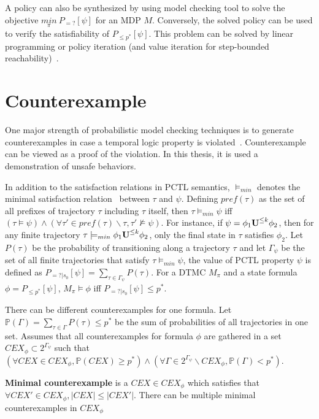 A policy can also be synthesized by using model checking tool to solve the objective $\underset{\pi}{min}\ P_{=?}[\psi]$ for an MDP $M$. Conversely, the solved policy can be used to verify the satisfiability of $P_{\leq p^*}[\psi]$. 
This problem can be solved by linear programming or policy iteration (and value iteration for step-bounded reachability)~\cite{Kwiatkowska2013}.

\section{Counterexample}
One major strength of probabilistic model checking techniques is to generate counterexamples in case a temporal logic property is violated~\cite{4770111}. Counterexample can be viewed as a proof of the violation. In this thesis, it is used a demonstration of unsafe behaviors.

In addition to the satisfaction relations in PCTL semantics, $\models_{min}$ denotes the minimal satisfaction relation~\cite{4770111} between $\tau$ and $\psi$. Defining $pref(\tau)$ as the set of all prefixes of trajectory $\tau$ including $\tau$ itself, then $\tau\models_{min} \psi$ iff $(\tau\models\psi) \wedge (\forall \tau'\in pref(\tau)\backslash\tau, \tau' \nvDash \psi)$. For instance, if $\psi=\phi_1 {\textbf{U}}^{\leq k}\phi_2$, then for any finite trajectory $\tau\models_{min}\phi_1 {\textbf{U}}^{\leq k}\phi_2$, only the final state in $\tau$ satisfies $\phi_2$. Let $P(\tau)$ be the probability of transitioning along a trajectory $\tau$ and let $\Gamma_\psi$ be the set of all finite trajectories that satisfy $\tau\models_{min}\psi$, the value of PCTL property $\psi$ is defined as $P_{=?|s_0}[\psi]=\sum\limits_{\tau\in\Gamma_\psi}P(\tau)$. For a DTMC $M_{\pi}$ and a state formula $\phi= P_{\leq p^*}[\psi]$, $M_{\pi} \models \phi$ iff $P_{=?|s_0}[\psi]\leq p^*$. 

There can be different counterexamples for one formula. Let $\mathbb{P}(\Gamma) = \sum_{\tau\in \Gamma}P(\tau)\leq p^*$ be the sum of probabilities of all trajectories in one set. Assumes that all counterexamples for formula $\phi$ are gathered in a set $CEX_{\phi}\subset 2^{\Gamma_\psi}$ such that $(\forall CEX\in CEX_{\phi},\mathbb{P}(CEX)\geq p^*) \wedge (\forall \Gamma\in 2^{\Gamma_\psi}\backslash CEX_{\phi}, \mathbb{P}(\Gamma)< p^*)$. 

\begin{definition}
\textbf{Minimal counterexample} is a $CEX\in CEX_{\phi}$ which satisfies that $\forall CEX'\in CEX_{\phi}, |CEX|\leq|CEX'|$. There can be multiple minimal counterexamples in $CEX_{\phi}$
\end{definition}


